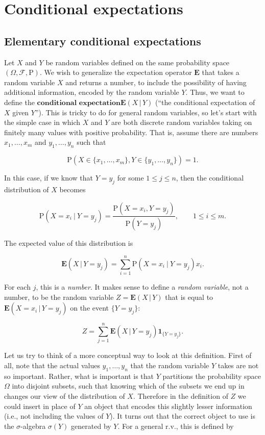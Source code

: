 

\chapter{Conditional expectations}

\section{Elementary conditional expectations}
Let $X$ and $Y$ be random variables defined on the
same probability space
$(\Omega, \mathcal{F}, \mathrm{P})$. We wish to
generalize the expectation operator $\mathbf{E}$ that
takes a random variable $X$ and returns a number, to
include the possibility of having additional
information, encoded by the random variable $Y$.
Thus, we want to define the
$\textbf{conditional expectation}$$\mathbf{E}\left(X\,|\,Y\right)$ (``the conditional
expectation of $X$ given $Y$''). This is tricky to do
for general random variables, so let's start with the
simple case in which $X$ and $Y$ are both discrete
random variables taking on finitely many values with
positive probability. That is, assume there are
numbers $x_1,\ldots, x_m$ and $y_1,\ldots, y_n$ such
that

\[
\mathrm{P}\left( X \in \{ x_1,\ldots, x_m\}, Y \in \{ y_1,\ldots, y_n \} \right) = 1.
\]

\noindent In this case, if we know that $Y=y_j$ for some
$1\le j\le n$, then the conditional distribution of
$X$ becomes

\[
\mathrm{P}(X = x_i\ |\ Y=y_j) = \frac{\mathrm{P}(X=x_i, Y=y_j)}{\mathrm{P}(Y=y_j)}, \qquad 1\le i\le m.
\]

\noindent The expected value of this distribution is

\[
\mathbf{E}\left(X\,|\,Y=y_j\right) = \sum_{i=1}^n \mathrm{P}(X = x_i\ |\ Y=y_j) x_i.
\]

\noindent For each $j$, this is a \emph{number}. It makes sense to
define a \emph{random variable}, not a number, to be the
random variable $Z=\mathbf{E}\left(X\,|\,Y\right)$
that is equal to
$\mathbf{E}\left(X=x_i\,|\,Y=y_j\right)$ on the event
$\{Y=y_j\}$:

\[
Z = \sum_{j=1}^n \mathbf{E}\left(X\,|\,Y=y_j\right) \mathbf{1}_{\{Y=y_j\}}.
\]

\noindent Let us try to think of a more conceptual way to look
at this definition. First of all, note that the actual
values $y_1,\ldots, y_n$ that the random variable $Y$
takes are not so important. Rather, what is important
is that $Y$ partitions the probability space $\Omega$
into disjoint subsets, such that knowing which of the
subsets we end up in changes our view of the
distribution of $X$. Therefore in the definition of
$Z$ we could insert in place of $Y$ an object that
encodes this slightly lesser information (i.e., not
including the values of $Y$). It turns out that the
correct object to use is the $\sigma$-algebra
$\sigma(Y)$ generated by $Y$. For a general r.v.,
this is defined by

